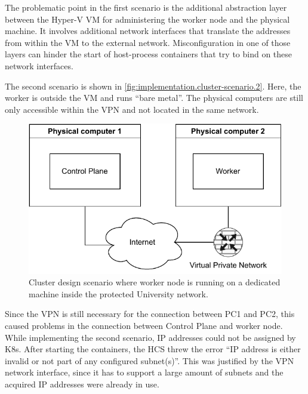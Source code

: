 The problematic point in the first scenario is the additional abstraction layer between the Hyper-V \ac{VM} for administering the worker node and the physical machine. It involves additional network interfaces that translate the addresses from within the \ac{VM} to the external network. Misconfiguration in one of those layers can hinder the start of host-process containers that try to bind on these network interfaces.

The second scenario is shown in \autoref{fig:implementation.cluster-scenario.2}. Here, the worker is outside the \ac{VM} and runs \enquote{bare metal}. The physical computers are still only accessible within the \ac{VPN} and not located in the same network.
\begin{figure}[ht]
\centering
\includegraphics[width=.8\textwidth]{Figures/Cluster-scenarios-2.pdf}
\caption{Cluster design scenario where worker node is running on a dedicated machine inside the protected University network.}
\label{fig:implementation.cluster-scenario.2}
\end{figure}
Since the \ac{VPN} is still necessary for the connection between PC1 and PC2, this caused problems in the connection between Control Plane and worker node. While implementing the second scenario, \ac{IP} addresses could not be assigned by \ac{K8s}. After starting the containers, the \ac{HCS} threw the error \enquote{IP address is either invalid or not part of any configured subnet(s)}. This was justified by the \ac{VPN} network interface, since it has to support a large amount of subnets and the acquired \ac{IP} addresses were already in use.

